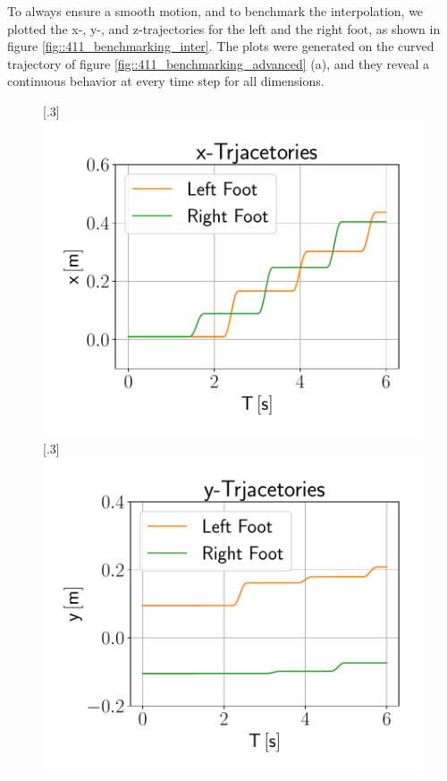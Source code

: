 To always ensure a smooth motion, and to benchmark the interpolation, we plotted the x-, y-, and z-trajectories for the left and the right foot, as shown in figure \ref{fig::411_benchmarking_inter}. The plots were generated on the curved trajectory of figure \ref{fig::411_benchmarking_advanced} (a), and they reveal a continuous behavior at every time step for all dimensions.
\begin{figure}[h!]
	\centering
	[.3\linewidth]{\includegraphics[scale=.3]{chapters/04_experiments/01_user_controlled_walking/01_benchmarking/interpolated_x_trajectories.pdf}}
	[.3\linewidth]{\includegraphics[scale=.3]{chapters/04_experiments/01_user_controlled_walking/01_benchmarking/interpolated_y_trajectories.pdf}}

\end{figure}
